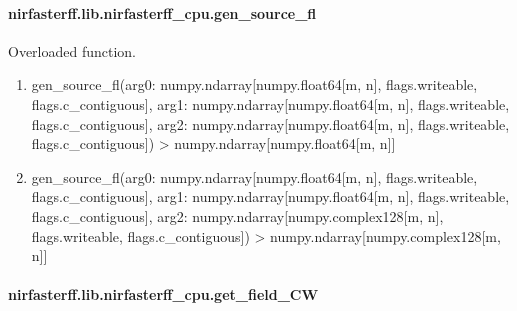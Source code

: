 \documentclass[letterpaper,10pt,english]{sphinxmanual}
\begin{document}
\sphinxstepscope


\paragraph{nirfasterff.lib.nirfasterff\_cpu.gen\_source\_fl}
\label{\detokenize{_autosummary/nirfasterff.lib.nirfasterff_cpu.gen_source_fl:nirfasterff-lib-nirfasterff-cpu-gen-source-fl}}\label{\detokenize{_autosummary/nirfasterff.lib.nirfasterff_cpu.gen_source_fl::doc}}

\begin{fulllineitems}
\label{\detokenize{_autosummary/nirfasterff.lib.nirfasterff_cpu.gen_source_fl:nirfasterff.lib.nirfasterff_cpu.gen_source_fl}}
\pysigstartsignatures
{}
\pysigstopsignatures
\sphinxAtStartPar
Overloaded function.
\begin{enumerate}
%
\item {} 
\sphinxAtStartPar
gen\_source\_fl(arg0: numpy.ndarray{[}numpy.float64{[}m, n{]}, flags.writeable, flags.c\_contiguous{]}, arg1: numpy.ndarray{[}numpy.float64{[}m, n{]}, flags.writeable, flags.c\_contiguous{]}, arg2: numpy.ndarray{[}numpy.float64{[}m, n{]}, flags.writeable, flags.c\_contiguous{]}) \sphinxhyphen{}\textgreater{} numpy.ndarray{[}numpy.float64{[}m, n{]}{]}

\item {} 
\sphinxAtStartPar
gen\_source\_fl(arg0: numpy.ndarray{[}numpy.float64{[}m, n{]}, flags.writeable, flags.c\_contiguous{]}, arg1: numpy.ndarray{[}numpy.float64{[}m, n{]}, flags.writeable, flags.c\_contiguous{]}, arg2: numpy.ndarray{[}numpy.complex128{[}m, n{]}, flags.writeable, flags.c\_contiguous{]}) \sphinxhyphen{}\textgreater{} numpy.ndarray{[}numpy.complex128{[}m, n{]}{]}

\end{enumerate}

\end{fulllineitems}


\sphinxstepscope


\paragraph{nirfasterff.lib.nirfasterff\_cpu.get\_field\_CW}
\label{\detokenize{_autosummary/nirfasterff.lib.nirfasterff_cpu.get_field_CW:nirfasterff-lib-nirfasterff-cpu-get-field-cw}}\label{\detokenize{_autosummary/nirfasterff.lib.nirfasterff_cpu.get_field_CW::doc}}
\end{document}
